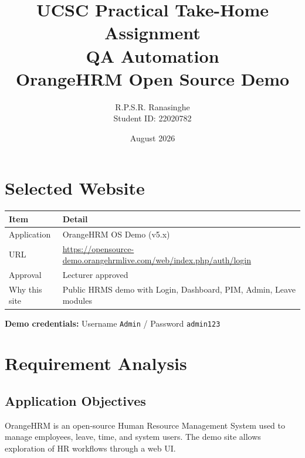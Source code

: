 ﻿\documentclass[11pt,a4paper]{article}
\title{\textbf{UCSC Practical Take-Home Assignment}\\QA Automation\\[0.4em]
\large OrangeHRM Open Source Demo}
\author{R.P.S.R. Ranasinghe\\Student ID: 22020782}
\date{August 2026}
\begin{document}
\maketitle
\thispagestyle{empty}

\begin{center}
\end{center}

\tableofcontents
\newpage

\section{Selected Website}

\begin{table}[H]
\centering
\begin{tabular}{@{}ll@{}}
\toprule
\textbf{Item} & \textbf{Detail} \\
\midrule
Application & OrangeHRM OS Demo (v5.x) \\
URL & \url{https://opensource-demo.orangehrmlive.com/web/index.php/auth/login} \\
Approval & Lecturer approved \\
Why this site & Public HRMS demo with Login, Dashboard, PIM, Admin, Leave modules \\
\bottomrule
\end{tabular}
\end{table}

\noindent\textbf{Demo credentials:} Username \texttt{Admin} / Password \texttt{admin123}

\section{Requirement Analysis}

\subsection{Application Objectives}
OrangeHRM is an open-source Human Resource Management System used to manage employees, leave, time, and system users. The demo site allows exploration of HR workflows through a web UI.
\end{document}
